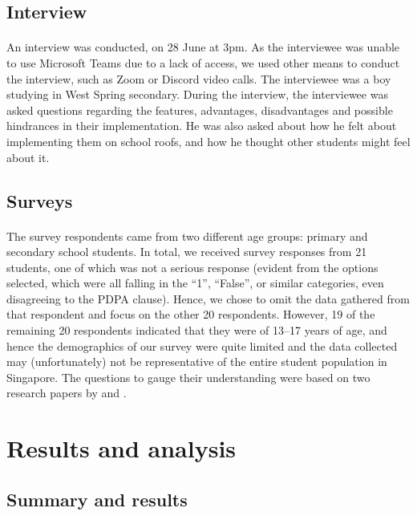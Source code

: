 \documentclass[a4paper]{article}
\begin{document}
\begin{multicols}{2}
  \subsection{Interview}
  \paragraph{} An interview was conducted, on 28 June at 3pm. As
  the interviewee was unable to use Microsoft Teams due to a lack
  of access, we used other means to conduct the interview, such as
  Zoom or Discord video calls. The interviewee was a boy studying in
  West Spring secondary. During the interview, the interviewee was
  asked questions regarding the features, advantages, disadvantages and
  possible hindrances in their implementation. He was also asked about
  how he felt about implementing them on school roofs, and how he thought
  other students might feel about it.

  \subsection{Surveys}
  \paragraph{} The survey respondents came from two different age groups:
  primary and secondary school students. In total, we received survey
  responses from 21 students, one of which was not a serious response
  (evident from the options selected, which were all falling in the
  ``1'', ``False'', or similar categories, even disagreeing to the
  PDPA clause). Hence, we chose to omit the data gathered from that
  respondent and focus on the other 20 respondents. However, 19 of the
  remaining 20 respondents indicated that they were of 13--17 years of
  age, and hence the demographics of our survey were quite limited and
  the data collected may (unfortunately) not be representative of the
  entire student population in Singapore. The questions to gauge their
  understanding were based on two research papers by \textcite{HKGreenRoofGL}
  and \textcite{energeff}.



  \section{Results and analysis}
  \subsection{Summary and results}

\end{multicols}
\end{document}
